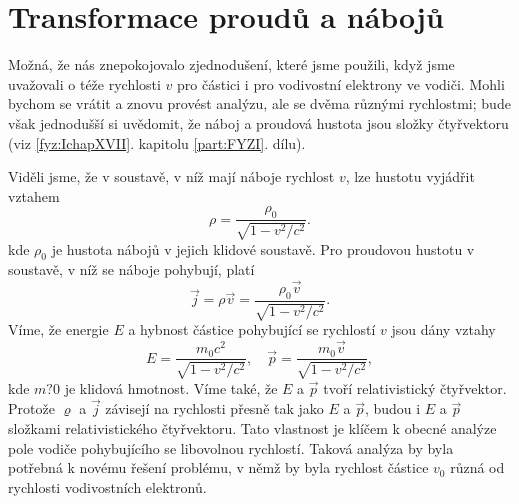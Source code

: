   \section{Transformace proudů a nábojů}\label{fyz:IIchapXIIIsecVII}
    Možná, že nás znepokojovalo zjednodušení, které jsme použili, když jsme uvažovali o téže
    rychlosti \(v\) pro částici i pro vodivostní elektrony ve vodiči. Mohli bychom se vrátit a znovu
    provést analýzu, ale se dvěma různými rychlostmi; bude však jednodušší si uvědomit, že náboj a
    proudová hustota jsou složky čtyřvektoru (viz \ref{fyz:IchapXVII}. kapitolu \ref{part:FYZI}.
    dílu). 
    
    Viděli jsme, že v soustavě, v níž mají náboje rychlost \(v\), lze hustotu vyjádřit vztahem
    \begin{equation*}
      ρ=\dfrac{ρ_0}{\sqrt{1−v^2/c^2}}.
    \end{equation*}
    kde \(ρ_0\) je hustota nábojů v jejich klidové soustavě. Pro proudovou hustotu v soustavě, v níž
    se náboje pohybují, platí
    \begin{equation}\label{fyz:eq890}
      \vec{j}=ρ\vec{v}=\dfrac{ρ_0\vec{v}}{\sqrt{1−v^2/c^2}}.
    \end{equation}
    Víme, že energie \(E\) a hybnost částice pohybující se rychlostí \(v\) jsou dány vztahy
    \begin{equation*}
      E=\dfrac{m_0c^2}{\sqrt{1−v^2/c^2}}, \quad \vec{p}=\dfrac{m_0\vec{v}}{\sqrt{1−v^2/c^2}},
    \end{equation*}
    kde \(m?0\) je klidová hmotnost. Víme také, že \(E\) a \(\vec{p}\) tvoří relativistický
    čtyřvektor. Protože \(\varrho\) a \(\vec{j}\) závisejí na rychlosti přesně tak jako \(E\) a
    \(\vec{p}\), budou i \(E\) a \(\vec{p}\) složkami relativistického čtyřvektoru. Tato vlastnost
    je klíčem k obecné analýze pole vodiče pohybujícího se libovolnou rychlostí. Taková analýza by
    byla potřebná k novému řešení problému, v němž by byla rychlost částice \(v_0\) různá od
    rychlosti vodivostních elektronů.

